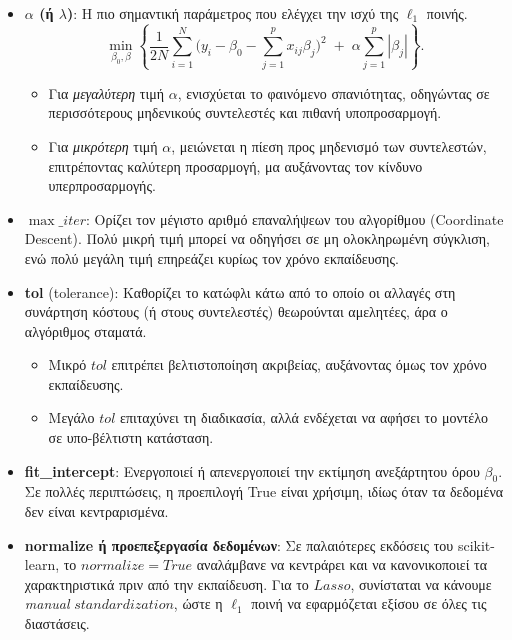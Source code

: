 \documentclass[12pt]{article}
\begin{document}
\begin{itemize}
    \item \textbf{\(\alpha\) (ή \(\lambda\))}: 
      Η πιο σημαντική παράμετρος που ελέγχει την ισχύ της \(\ell_1\) ποινής. 
      \[
        \min_{\beta_0,\beta}
        \left\{
          \frac{1}{2N}\sum_{i=1}^{N} \bigl(y_i - \beta_0 - \sum_{j=1}^{p} x_{ij}\beta_j \bigr)^2 
          \;+\;
          \alpha \sum_{j=1}^{p} |\beta_j|
        \right\}.
      \]
      \begin{itemize}
        \item Για \emph{μεγαλύτερη} τιμή \(\alpha\), ενισχύεται το φαινόμενο σπανιότητας, οδηγώντας σε περισσότερους μηδενικούς συντελεστές και πιθανή υποπροσαρμογή.
        \item Για \emph{μικρότερη} τιμή \(\alpha\), μειώνεται η πίεση προς μηδενισμό των συντελεστών, επιτρέποντας καλύτερη προσαρμογή, μα αυξάνοντας τον κίνδυνο υπερπροσαρμογής.
      \end{itemize}
    
    \item \textbf{\(\max\_iter\)}: 
      Ορίζει τον μέγιστο αριθμό επαναλήψεων του αλγορίθμου (\textlatin{Coordinate Descent}). Πολύ μικρή τιμή μπορεί να οδηγήσει σε μη ολοκληρωμένη σύγκλιση, ενώ πολύ μεγάλη τιμή επηρεάζει κυρίως τον χρόνο εκπαίδευσης.
    
    \item \textbf{\textlatin{tol}} \textlatin{(tolerance)}:
      Καθορίζει το κατώφλι κάτω από το οποίο οι αλλαγές στη συνάρτηση κόστους (ή στους συντελεστές) θεωρούνται αμελητέες, άρα ο αλγόριθμος σταματά. 
      \begin{itemize}
        \item Μικρό \(tol\) επιτρέπει βελτιστοποίηση ακριβείας, αυξάνοντας όμως τον χρόνο εκπαίδευσης.
        \item Μεγάλο \(tol\) επιταχύνει τη διαδικασία, αλλά ενδέχεται να αφήσει το μοντέλο σε υπο-βέλτιστη κατάσταση.
      \end{itemize}
    
    \item \textbf{\textlatin{fit\_intercept}}:
      Ενεργοποιεί ή απενεργοποιεί την εκτίμηση ανεξάρτητου όρου \(\beta_0\). Σε πολλές περιπτώσεις, η προεπιλογή \textlatin{True} είναι χρήσιμη, ιδίως όταν τα δεδομένα δεν είναι κεντραρισμένα.
    
    \item \textbf{\textlatin{normalize} ή προεπεξεργασία δεδομένων}:
      Σε παλαιότερες εκδόσεις του \textlatin{scikit-learn}, το \(normalize=True\) αναλάμβανε να κεντράρει και να κανονικοποιεί τα χαρακτηριστικά πριν από την εκπαίδευση. Για το $Lasso$, συνίσταται να κάνουμε \textlatin{\emph{manual}} \(standardization\), ώστε η \(\ell_1\) ποινή να εφαρμόζεται εξίσου σε όλες τις διαστάσεις.
    

\end{itemize}
\end{document}
